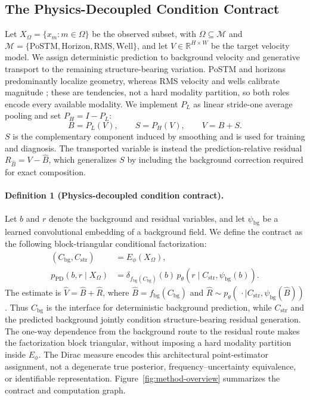 \subsection{The Physics-Decoupled Condition Contract}
Let $X_\Omega=\{x_m:m\in\Omega\}$ be the observed subset, with $\Omega\subseteq\mathcal M$ and $\mathcal M=\{\mathrm{PoSTM},\mathrm{Horizon},\mathrm{RMS},\mathrm{Well}\}$, and let $V\in\mathbb R^{H\times W}$ be the target velocity model. We assign deterministic prediction to background velocity and generative transport to the remaining structure-bearing variation. PoSTM and horizons predominantly localize geometry, whereas RMS velocity and wells calibrate magnitude \cite{stolt1978migration,dix1955velocities,hampson2001multiattribute}; these are tendencies, not a hard modality partition, so both roles encode every available modality. We implement $P_L$ as linear stride-one average pooling and set $P_H=I-P_L$:
\begin{equation}
B=P_L(V),\qquad S=P_H(V),\qquad V=B+S.
\label{eq:frequency-view}
\end{equation}
$S$ is the complementary component induced by smoothing and is used for training and diagnosis. The transported variable is instead the prediction-relative residual $R_{\hat B}=V-\hat B$, which generalizes $S$ by including the background correction required for exact composition.

\paragraph{Definition 1 (Physics-decoupled condition contract).}
Let $b$ and $r$ denote the background and residual variables, and let $\psi_{\mathrm{bg}}$ be a learned convolutional embedding of a background field. We define the contract as the following block-triangular conditional factorization:
\begin{equation}
\begin{aligned}
(C_{\mathrm{bg}},C_{\mathrm{str}})&=E_\phi(X_\Omega),\\
p_{\mathrm{PD}}(b,r\mid X_\Omega)
&=\delta_{f_{\mathrm{bg}}(C_{\mathrm{bg}})}(b)
\,p_\theta(r\mid C_{\mathrm{str}},\psi_{\mathrm{bg}}(b)).
\end{aligned}
\label{eq:asymmetric-factorization}
\end{equation}
The estimate is $\hat V=\hat B+\hat R$, where $\hat B=f_{\mathrm{bg}}(C_{\mathrm{bg}})$ and $\hat R\sim p_\theta(\,\cdot\mid C_{\mathrm{str}},\psi_{\mathrm{bg}}(\hat B))$. Thus $C_{\mathrm{bg}}$ is the interface for deterministic background prediction, while $C_{\mathrm{str}}$ and the predicted background jointly condition structure-bearing residual generation. The one-way dependence from the background route to the residual route makes the factorization block triangular, without imposing a hard modality partition inside $E_\phi$. The Dirac measure encodes this architectural point-estimator assignment, not a degenerate true posterior, frequency--uncertainty equivalence, or identifiable representation. Figure~\ref{fig:method-overview} summarizes the contract and computation graph.

